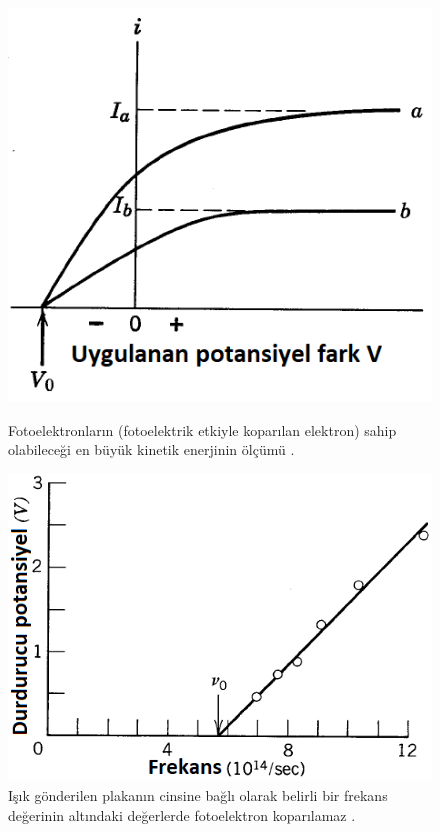 \documentclass[a4paper,12pt, twoside]{article}
\begin{document}
\begin{figure}[hbtp]
\center
\begin{minipage}{0.45\textwidth}
\includegraphics[scale=.5]{fotoeletrik_enyuksek_KE.png}
\caption{Fotoelektronların (fotoelektrik etkiyle koparılan elektron) sahip olabileceği en büyük kinetik enerjinin ölçümü \cite{book:EisbergResnick}.}
\label{fig:fotoeletrik_elektron_KE}
\end{minipage}
\hspace{24pt}
\begin{minipage}{0.45\textwidth}
\includegraphics[scale=.5]{fotoeletrik_nu0_workFunction.png}
\caption{Işık gönderilen plakanın cinsine bağlı olarak belirli bir frekans değerinin altındaki değerlerde fotoelektron koparılamaz \cite{book:EisbergResnick}.}
\label{fig:fotoeletrik_workfunction}
\end{minipage}
\end{figure}
\end{document}
